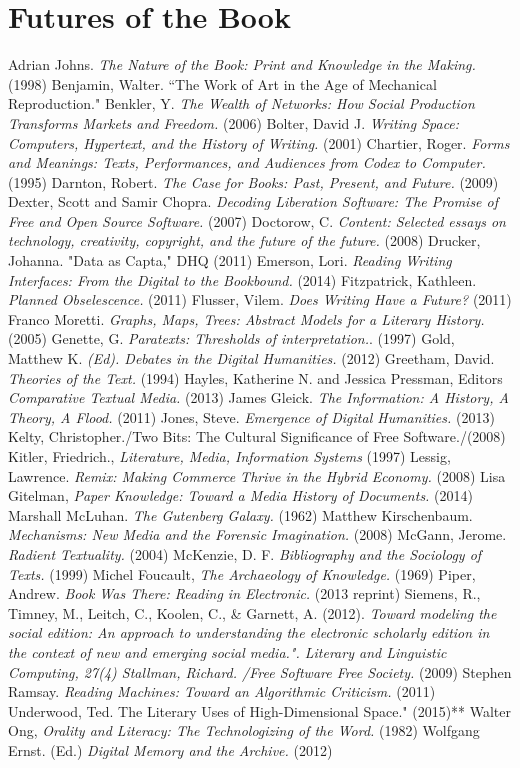 \documentclass[11pt]{article}
\begin{document}
\section*{Futures of the Book}
\label{sec-2}
Adrian Johns. \emph{The Nature of the Book: Print and Knowledge in the Making.} (1998)
Benjamin, Walter. “The Work of Art in the Age of Mechanical Reproduction."
Benkler, Y. \emph{The Wealth of Networks: How Social Production Transforms Markets and Freedom.} (2006)
Bolter, David J. \emph{Writing Space: Computers, Hypertext, and the History of Writing.} (2001)
Chartier, Roger. \emph{Forms and Meanings: Texts, Performances, and Audiences from Codex to Computer.} (1995)
Darnton, Robert. \emph{The Case for Books: Past, Present, and Future.} (2009)
Dexter, Scott and Samir Chopra.  \emph{Decoding Liberation Software: The Promise of Free and Open Source Software.} (2007)
Doctorow, C. \emph{Content: Selected essays on technology, creativity, copyright, and the future of the future.} (2008)
Drucker, Johanna. "Data as Capta," DHQ (2011)
Emerson, Lori. \emph{Reading Writing Interfaces: From the Digital to the Bookbound.} (2014)
Fitzpatrick, Kathleen. \emph{Planned Obselescence.} (2011)
Flusser, Vilem. \emph{Does Writing Have a Future?} (2011)
Franco Moretti. \emph{Graphs, Maps, Trees: Abstract Models for a Literary History.} (2005)
Genette, G. \emph{Paratexts: Thresholds of interpretation.}. (1997)
Gold, Matthew K. \emph{(Ed). Debates in the Digital Humanities.} (2012)
Greetham, David. \emph{Theories of the Text.} (1994)
Hayles, Katherine N. and Jessica Pressman, Editors \emph{Comparative Textual Media.} (2013)
James Gleick. \emph{The Information: A History, A Theory, A Flood.} (2011)
Jones, Steve. \emph{Emergence of Digital Humanities.} (2013)
Kelty, Christopher./Two Bits: The Cultural Significance of Free Software./(2008)
Kitler, Friedrich., \emph{Literature, Media, Information Systems} (1997)
Lessig, Lawrence. \emph{Remix: Making Commerce Thrive in the Hybrid Economy.} (2008)
Lisa Gitelman, \emph{Paper Knowledge: Toward a Media History of Documents.} (2014)
Marshall McLuhan. \emph{The Gutenberg Galaxy.} (1962)
Matthew Kirschenbaum. \emph{Mechanisms: New Media and the Forensic Imagination.} (2008)
McGann, Jerome. \emph{Radient Textuality.} (2004)
McKenzie, D. F. \emph{Bibliography and the Sociology of Texts.} (1999)
Michel Foucault, \emph{The Archaeology of Knowledge.} (1969) 
Piper, Andrew. \emph{Book Was There: Reading in Electronic.} (2013 reprint)
Siemens, R., Timney, M., Leitch, C., Koolen, C., \& Garnett, A. (2012). \emph{Toward modeling the social edition: An approach to understanding the electronic scholarly edition in the context of new and emerging social media.". Literary and Linguistic Computing, 27(4)
Stallman, Richard. /Free Software Free Society.} (2009)
Stephen Ramsay. \emph{Reading Machines: Toward an Algorithmic Criticism.} (2011)
Underwood, Ted. The Literary Uses of High-Dimensional Space." (2015)** Walter Ong, \emph{Orality and Literacy: The Technologizing of the Word.} (1982)
Wolfgang Ernst. (Ed.) \emph{Digital Memory and the Archive.} (2012)
\end{document}
